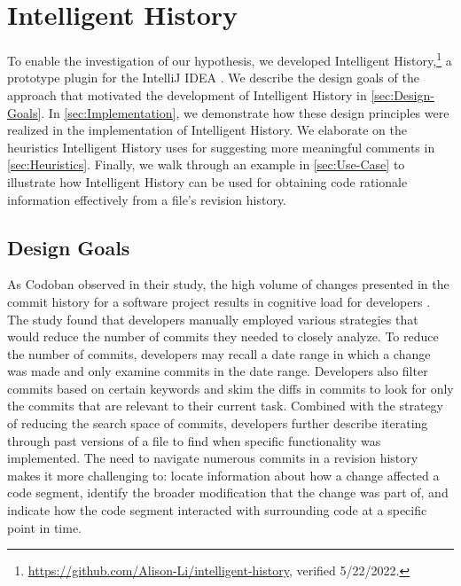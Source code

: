 \chapter{Intelligent History}
\label{ch:Intelligent-History}

To enable the investigation of our hypothesis, we developed Intelligent History,\footnote{\url{https://github.com/Alison-Li/intelligent-history}, verified 5/22/2022.} 
a prototype plugin for the IntelliJ IDEA .
We describe the design goals of the approach that motivated the development of Intelligent History in \autoref{sec:Design-Goals}. 
In \autoref{sec:Implementation}, we demonstrate how these design principles were realized in the implementation of Intelligent History. 
We elaborate on the heuristics Intelligent History uses for suggesting more meaningful comments in \autoref{sec:Heuristics}.
Finally, we walk through an example in \autoref{sec:Use-Case} to illustrate how Intelligent History can be used for obtaining code rationale information effectively from a file's revision history.

\section{Design Goals}
\label{sec:Design-Goals}

As Codoban \etal observed in their study, the high volume of changes presented in the commit history 
for a software project results in cognitive load for developers \cite{codoban_software_2015}.
The study found that developers manually employed various strategies that would 
reduce the number of commits they needed to closely analyze.
To reduce the number of commits, developers may recall a date range in which 
a change was made and only examine commits in the date range.
Developers also filter commits based on certain keywords and skim the diffs 
in commits to look for only the commits that are relevant to their current task.
Combined with the strategy of reducing the search space of commits, 
developers further describe iterating through past versions of a file to find when specific functionality was implemented.
The need to navigate numerous commits in a revision history 
makes it more challenging to: locate information about how a change affected a code segment, 
identify the broader modification that the change was part of, 
and indicate how the code segment interacted with surrounding code at a specific point in time.


